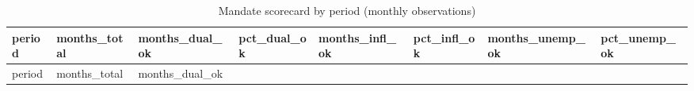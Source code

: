 \documentclass[
  11pt,
]{article}
\begin{document}
\begin{longtable}[]{@{}
  >{\raggedright\arraybackslash}p{}
  >{\raggedleft\arraybackslash}p{}
  >{\raggedleft\arraybackslash}p{}
  >{\raggedleft\arraybackslash}p{}
  >{\raggedleft\arraybackslash}p{}
  >{\raggedleft\arraybackslash}p{}
  >{\raggedleft\arraybackslash}p{}
  >{\raggedleft\arraybackslash}p{}@{}}
\caption{Mandate scorecard by period (monthly
observations)}\tabularnewline
\toprule\noalign{}
\begin{minipage}[b]{\linewidth}\raggedright
period
\end{minipage} & \begin{minipage}[b]{\linewidth}\raggedleft
months\_total
\end{minipage} & \begin{minipage}[b]{\linewidth}\raggedleft
months\_dual\_ok
\end{minipage} & \begin{minipage}[b]{\linewidth}\raggedleft
pct\_dual\_ok
\end{minipage} & \begin{minipage}[b]{\linewidth}\raggedleft
months\_infl\_ok
\end{minipage} & \begin{minipage}[b]{\linewidth}\raggedleft
pct\_infl\_ok
\end{minipage} & \begin{minipage}[b]{\linewidth}\raggedleft
months\_unemp\_ok
\end{minipage} & \begin{minipage}[b]{\linewidth}\raggedleft
pct\_unemp\_ok
\end{minipage} \\
\midrule\noalign{}
\endfirsthead
\toprule\noalign{}
\begin{minipage}[b]{\linewidth}\raggedright
period
\end{minipage} & \begin{minipage}[b]{\linewidth}\raggedleft
months\_total
\end{minipage} & \begin{minipage}[b]{\linewidth}\raggedleft
months\_dual\_ok
\end{minipage} & \begin{minipage}[b]{\linewidth}\raggedleft

\end{minipage}
\end{longtable}
\end{document}

